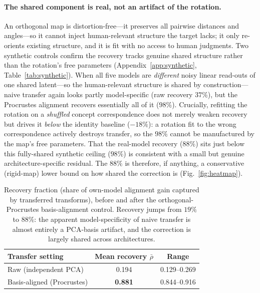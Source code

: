 \documentclass{article}
\begin{document}
\paragraph{The shared component is real, not an artifact of the rotation.} An orthogonal
map is distortion-free---it preserves all pairwise distances and angles---so it cannot
inject human-relevant structure the target lacks; it only re-orients existing structure,
and it is fit with no access to human judgments. Two synthetic controls confirm the
recovery tracks genuine shared structure rather than the rotation's free parameters
(Appendix~\ref{app:synthetic}, Table~\ref{tab:synthetic}). When all five models are
\emph{different} noisy linear read-outs of one shared latent---so the human-relevant
structure is shared by construction---naive transfer again looks partly model-specific
(raw recovery $37\%$), but the Procrustes alignment recovers essentially all of it
($98\%$). Crucially, refitting the rotation on a \emph{shuffled} concept correspondence
does not merely weaken recovery but drives it \emph{below} the identity baseline
($-18\%$): a rotation fit to the wrong correspondence actively destroys transfer, so the
$98\%$ cannot be manufactured by the map's free parameters. That the real-model recovery
($88\%$) sits just below this fully-shared synthetic ceiling ($98\%$) is consistent with
a small but genuine architecture-specific residual. The $88\%$ is therefore, if anything,
a conservative (rigid-map) lower bound on how shared the correction is
(Fig.~\ref{fig:heatmap}).

\begin{table}[t]
\centering
\caption{Recovery fraction (share of own-model alignment gain captured by transferred
transforms), before and after the orthogonal-Procrustes basis-alignment control.
Recovery jumps from $19\%$ to $88\%$: the apparent model-specificity of naive transfer
is almost entirely a PCA-basis artifact, and the correction is largely shared across
architectures.}
\label{tab:recovery}
\begin{tabular}{lcc}
\toprule
Transfer setting & Mean recovery $\bar\rho$ & Range \\
\midrule
Raw (independent PCA)      & 0.194 & 0.129--0.269 \\
Basis-aligned (Procrustes) & \textbf{0.881} & 0.844--0.916 \\
\bottomrule
\end{tabular}
\end{table}
\end{document}
